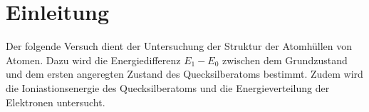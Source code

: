 \section{Einleitung}
\label{sec:einleitung}
Der folgende Versuch dient der Untersuchung der Struktur der Atomhüllen von Atomen. Dazu wird die Energiedifferenz $E_1-E_0$ zwischen dem 
Grundzustand und dem ersten angeregten Zustand des Quecksilberatoms bestimmt. Zudem wird die Ioniastionsenergie des Quecksilberatoms und 
die Energieverteilung der Elektronen untersucht.